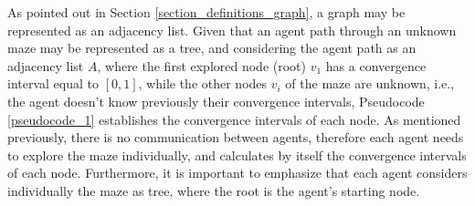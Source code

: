 As pointed out in Section \ref{section_definitions_graph}, a graph may be represented as an adjacency list. Given that an agent path through an unknown maze may be represented as a tree, and considering the agent path as an adjacency list $A$, where the first explored node (root) $v_{1}$ has a convergence interval equal to $[0,1]$, while the other nodes $v_{i}$ of the maze are unknown, i.e., the agent doesn't know previously their convergence intervals, Pseudocode \ref{pseudocode_1} establishes the convergence intervals of each node. As mentioned previously, there is no communication between agents, therefore each agent needs to explore the maze individually, and calculates by itself the convergence intervals of each node. Furthermore, it is important to emphasize that each agent considers individually the maze as tree, where the root is the agent's starting node.

